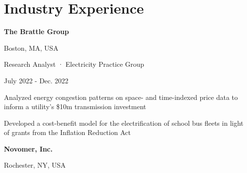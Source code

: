 \vspace{-5pt}
\section{Industry Experience}
    \begin{minipage}{.75\linewidth} \begin{flushleft}
    		\textbf{The Brattle Group}
    	\end{flushleft} \end{minipage}
    \hfill 
    \begin{minipage}{.20\linewidth}\begin{flushright}
    	 Boston, MA, USA
    	\end{flushright}\end{minipage}
     
    \begin{minipage}{.75\linewidth} \begin{flushleft}
    		Research Analyst · Electricity Practice Group
    	\end{flushleft} \end{minipage}
    \hfill 
    \begin{minipage}{.20\linewidth}\begin{flushright}
    	 July 2022 - Dec. 2022
    	\end{flushright}\end{minipage}
        \vspace{-5pt}
	\begin{description}[font=$\bullet$]
	\item{Analyzed energy congestion patterns on space- and time-indexed price data to inform a utility's \$10m transmission investment}
    \vspace{-6pt}
    \item{Developed a cost-benefit model for the electrification of school bus fleets in light of grants from the Inflation Reduction Act}
	\end{description}

    \begin{minipage}{.75\linewidth} \begin{flushleft}
    		\textbf{Novomer, Inc.}
    	\end{flushleft} \end{minipage}
    \hfill 
    \begin{minipage}{.20\linewidth}\begin{flushright}
    	 Rochester, NY, USA
    	\end{flushright}\end{minipage}
     
